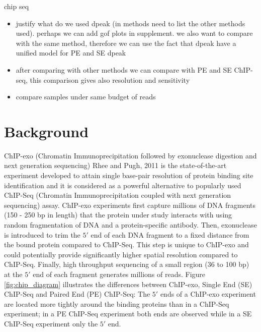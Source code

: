 \documentclass{bmcart}\usepackage[]{graphicx}\usepackage[]{color}
\begin{document}
\begin{enumerate}
  chip seq
  \begin{itemize}
  \item justify what do we used dpeak (in methods need to list the
    other methods used). perhaps we can add gof plots in
    supplement. we also want to compare with the same method,
    therefore we can use the fact that dpeak have a unified model for
    PE and SE dpeak
  \item after comparing with other methods we can compare with PE and
    SE ChIP-seq, this comparison gives also resolution and sensitivity
  \item compare samples under same budget of reads
  \end{itemize} 
\end{enumerate}

\color{black}

\newpage

\section{Background}
\label{sec:intro}

ChIP-exo (Chromatin Immunoprecipitation followed by exonuclease
digestion and next generation sequencing) Rhee and Pugh, 2011
\cite{exo1} is the state-of-the-art experiment developed to attain
single base-pair resolution of protein binding site identification and
it is considered as a powerful alternative to popularly used ChIP-Seq
(Chromatin Immunoprecipitation coupled with next generation
sequencing) assay. ChIP-exo experiments first capture millions of DNA
fragments (150 - 250 bp in length) that the protein under study
interacts with using random fragmentation of DNA and a
protein-specific antibody. Then, exonuclease is introduced to trim the
$5\prime$ end of each DNA fragment to a fixed distance from the bound
protein compared to ChIP-Seq. This step is unique to ChIP-exo and
could potentially provide significantly higher spatial resolution
compared to ChIP-Seq. Finally, high throughput sequencing of a small
region (36 to 100 bp) at the $5\prime$ end of each fragment generates
millions of reads. Figure \ref{fig:chip_diagram} illustrates the
differences between ChIP-exo, Single End (SE) ChIP-Seq and Paired End
(PE) ChIP-Seq: The $5\prime$ ends of a ChIP-exo experiment are located
more tightly around the binding proteins than in a ChIP-Seq
experiment; in a PE ChIP-Seq experiment both ends are observed while
in a SE ChIP-Seq experiment only the $5\prime$ end.

\end{document}
